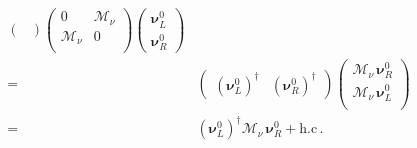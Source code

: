 \begin{frame}
\begin{align}
\begin{pmatrix}
  \end{pmatrix}
  \begin{pmatrix}
                                      0 & \boldsymbol{\mathcal{M}}_{\nu} \\
                                      \boldsymbol{\mathcal{M}}_{\nu} & 0 \\
                                    \end{pmatrix}
\begin{pmatrix}
    \boldsymbol{\nu}_L^{0} \\
    \boldsymbol{\nu}_R^{0}
  \end{pmatrix} \nonumber\\
=&  \begin{pmatrix}
    \left( \boldsymbol{\nu}_L^0 \right)^{\dagger}&
    \left(\boldsymbol{\nu}_R^0  \right)^{\dagger}
  \end{pmatrix}
  \begin{pmatrix}
         \boldsymbol{\mathcal{M}}_{\nu}\,\boldsymbol{\nu}_R^{0} \\
    \boldsymbol{\mathcal{M}}_{\nu}\, \boldsymbol{\nu}_L^{0} \\
  \end{pmatrix} \nonumber\\
  =&\left( \boldsymbol{\nu}_L^0 \right)^{\dagger} \boldsymbol{\mathcal{M}}_{\nu}\,   \boldsymbol{\nu}_R^{0} +\text{h.c}\,.
\end{align}
\end{frame}

